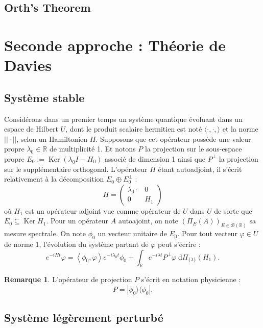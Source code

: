 \documentclass[12pt,openany,a4paper, titlepage]{article}
\newcommand{\lp}{\left(}
\newcommand{\rp}{\right)}
\newcommand{\la}{\left\langle}
\newcommand{\ra}{\right\rangle}
\newcommand{\dd}{\;\mathrm{d}}
\newcommand{\R}{\mathbb{R}}
\newcommand{\St}[2]{e^{-i #1 #2}}
\newcommand{\ortho}{P^\perp}
\newcommand{\Ker}{\operatorname{Ker}}
\theoremstyle{definition}
\theoremstyle{definition}
\theoremstyle{definition}
\theoremstyle{definition}
\theoremstyle{definition}
\newtheorem{rem}{Remarque}
\theoremstyle{definition}
\begin{document}
\subsection{Orth's Theorem}

\section{Seconde approche : Théorie de Davies}

\subsection{Système stable}

Considérons dans un premier temps un système quantique évoluant dans un espace de Hilbert $U$, dont le produit scalaire hermitien est noté $\langle \cdot, \cdot, \rangle$ et la norme $||\cdot ||$, selon un Hamiltonien $H$. Supposons que cet opérateur possède une valeur propre $\lambda_0 \in \R$ de multiplicité 1. Et notons $P$ la projection sur le sous-espace propre $E_0 := \Ker\lp \lambda_0 I - H_0 \rp$ associé de dimension 1 ainsi que $\ortho$ la projection sur le supplémentaire orthogonal. L'opérateur $H$ étant autoadjoint, il s'écrit relativement à la décomposition $E_0\oplus E_0^\perp$ :
\begin{equation}
    H = \begin{pmatrix}
    \lambda_0 \cdot & 0 \\
    0 & H_1 
\end{pmatrix}
\end{equation}
où $H_1$ est un opérateur adjoint vue comme opérateur de $U$ dans $U$ de sorte que $E_0 \subseteq \Ker H_1$. Pour un opérateur $A$ autoajoint, on note $\lp\Pi_E(A)\rp_{E\in\mathcal{B}(\R)}$ sa mesure spectrale. On note $\phi_0$ un vecteur unitaire de $E_0$. Pour tout vecteur $\varphi \in U$ de norme 1, l'évolution du système partant de $\varphi$ peut s'écrire :
$$\St{H}{t}\varphi = \la \phi_0, \varphi \ra \St{\lambda_0}{t} \phi_0 + \int_\R \St{\lambda}{t}\ortho \varphi \dd \Pi_{\{\lambda\}}(H_1).$$

\begin{rem}
L'opérateur de projection $P$ s'écrit en notation physicienne : $$ P = |\phi_0\rangle \langle \phi_0|.$$
\end{rem}

\subsection{Système légèrement perturbé}
\end{document}
